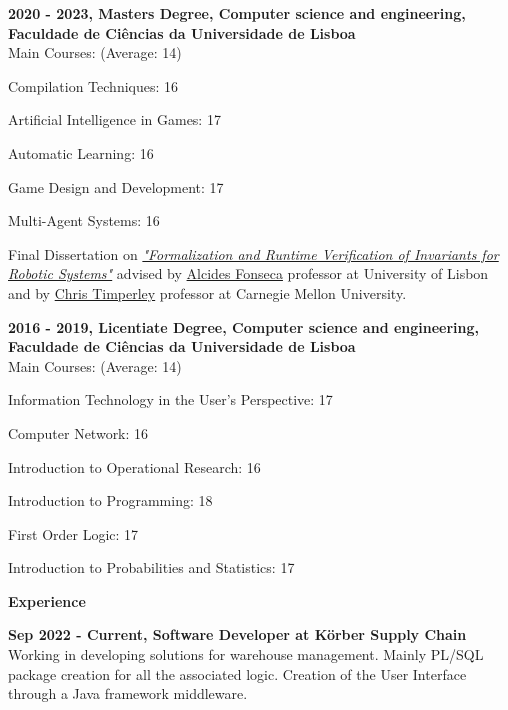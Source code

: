 \documentclass[a4paper,12pt,final]{memoir}
\newcommand{\Sep}{\vspace{1.5em}}
\newcommand{\SmallSep}{\vspace{0.5em}}
\newcommand{\CVSection}[1]
	{\Large\textbf{#1}\par
	\SmallSep\normalsize\normalfont}
\newcommand{\CVItem}[1]
	{\textbf{\color{RoyalBlue} #1}}
\begin{document}
\CVItem{2020 - 2023, Masters Degree, Computer science and engineering, Faculdade de Ciências da Universidade de Lisboa}\\
Main Courses: (Average: 14)
\begin{multicols}{2}
\begin{compactitem}[\color{RoyalBlue}$\circ$]
    \item Compilation Techniques: 16
	\item Artificial Intelligence in Games: 17
	\item Automatic Learning: 16
	\item Game Design and Development: 17
	\item Multi-Agent Systems: 16
\end{compactitem}
\end{multicols}
\SmallSep
Final Dissertation on \href{https://github.com/ricardocajo/thesis}{\textit{"Formalization and Runtime Verification of Invariants for Robotic
Systems"}} advised by \href{https://wiki.alcidesfonseca.com/about/}{Alcides Fonseca} professor at University of Lisbon and by \href{http://www.christimperley.co.uk/}{Chris Timperley} professor at Carnegie Mellon University.
\SmallSep

\CVItem{2016 - 2019, Licentiate Degree, Computer science and engineering, Faculdade de Ciências da Universidade de Lisboa}\\
Main Courses: (Average: 14)
\begin{multicols}{2}
\begin{compactitem}[\color{RoyalBlue}$\circ$]
    \item Information Technology in the User's Perspective: 17
	\item Computer Network: 16
	\item Introduction to Operational Research: 16
	\item Introduction to Programming: 18 
	\item First Order Logic: 17
	\item Introduction to Probabilities and Statistics: 17
\end{compactitem}
\end{multicols}
\SmallSep

\Sep

\CVSection{Experience}

\CVItem{Sep 2022 - Current, Software Developer at Körber Supply Chain}\\
Working in developing solutions for warehouse management. Mainly PL/SQL package creation for all the associated logic. Creation of the User Interface through a Java framework middleware.
\SmallSep
\end{document}
